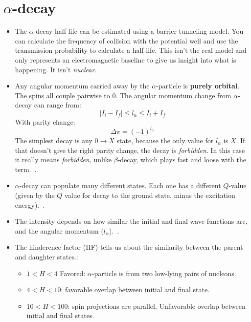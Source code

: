 \documentclass[letter]{article}
\begin{document}
\section{$\alpha$-decay}

\begin{itemize}
\item The $\alpha$-decay half-life can be estimated using a barrier
  tunneling model. You can calculate the frequency of collision with
  the potential well and use the transmission probability to calculate
  a half-life. This isn't the real model and only represents an
  electromagnetic baseline to give us insight into what is
  happening. It isn't \textit{nuclear}.~\cite[Lec. 18]{lecture}
\item Any angular momentum carried away by the $\alpha$-particle is
  \textbf{purely orbital}. The spins all couple pairwise to
  0. The angular momentum change from $\alpha$-decay can range from:
  \begin{equation*}
    |I_i-I_f| \leq l_{\alpha} \leq I_i + I_f
  \end{equation*}
With parity change:
\begin{equation*}
  \Delta\pi = {(-1)}^{l_{\alpha}}
\end{equation*}
The simplest decay is any $0 \to X$ state, because the only value
for $l_{\alpha}$ is $X$. If that doesn't give the right parity change,
the decay is \textit{forbidden}. In this case it really means
\textit{forbidden}, unlike $\beta$-decay, which plays fast and loose
with the term.~\cite[pp. 257-258]{krane}.
\item $\alpha$-decay can populate many different states. Each one has
  a different $Q$-value (given by the $Q$ value for decay to the
  ground state, minus the excitation
  energy).~\cite[pp. 257-258]{krane}.
\item The intensity depends on how similar the initial and final wave
  functions are, and the angular momentum ($l_{\alpha}$).~\cite[pp. 257-258]{krane}.
\item The hinderence factor (HF) tells us about the similarity between
  the parent and daughter states.:
  \begin{itemize}
  \item $1<H<4$ Favored: $\alpha$-particle is from two low-lying pairs
    of nucleons.
  \item $4<H<10$: favorable overlap between initial and final state.
  \item $10<H<100$: spin projections are parallel. Unfavorable overlap
    between initial and final states.

\end{itemize}
\end{itemize}
\end{document}
